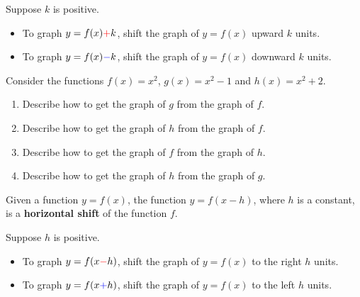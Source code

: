 \begin{howto}
  Suppose $k$ is positive. 
\begin{itemize}
  \item To graph $y=f(x) {\color{red} +}k$, shift the graph of $y=f(x)$ {\color{red}upward} $k$ units. 
  \item To graph $y=f(x) {\color{blue} -}k$, shift the graph of $y=f(x)$ {\color{blue}downward} $k$ units. 
\end{itemize}
\end{howto}

\begin{example}
  Consider the functions $f(x)=x^2$, $g(x)=x^2-1$ and $h(x)=x^2+2$.
  \begin{enumerate}
    \item Describe how to get the graph of $g$ from the graph of $f$.
    \item Describe how to get the graph of $h$ from the graph of $f$.
    \item Describe how to get the graph of $f$ from the graph of $h$.
    \item Describe how to get the graph of $h$ from the graph of $g$.
  \end{enumerate}
\end{example}




\begin{definition}
  Given a function \(y=f(x)\), the function \(y=f(x-h)\), where \(h\) is a constant, is a \textbf{horizontal shift} of the function \(f\). 
  \end{definition}

\begin{howto}
  Suppose $h$ is positive. 
\begin{itemize}
  \item To graph $y=f(x {\color{red} -} h)$, shift the graph of $y=f(x)$ to the {\color{red} right} $h$ units. 
  \item To graph $y=f(x {\color{blue} +} h)$, shift the graph of $y=f(x)$ to the {\color{blue} left} $h$ units. 
\end{itemize}
\end{howto}

